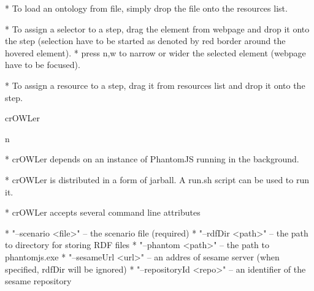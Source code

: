   * To load an ontology from file, simply drop the file onto the resources list. 

  * To assign a selector to a step, drag the element from webpage and drop it
  onto the step (selection have to be started as denoted by red border around the
  hovered element). 
  \begitems
    * press n,w to narrow or wider the selected element (webpage have to be
      focused). 
  \enditems

  * To assign a resource to a step, drag it from resources list and drop it
  onto the step. 
\enditems


\sec crOWLer


\begitems \style n

  * crOWLer depends on an instance of PhantomJS 
  running in the background. 

  * crOWLer is distributed in a form of jarball. A run.sh script can be used to run it. 

  * crOWLer accepts several command line attributes
  
  \begitems
    * "--scenario <file>" -- the scenario file (required)
    * "--rdfDir <path>" -- the path to directory for storing RDF files
    * "--phantom <path>" -- the path to phantomjs.exe
    * "--sesameUrl <url>" -- an addres of sesame server (when specified, rdfDir will be ignored)
    * "--repositoryId <repo>" -- an identifier of the sesame repository
  \enditems
\enditems











